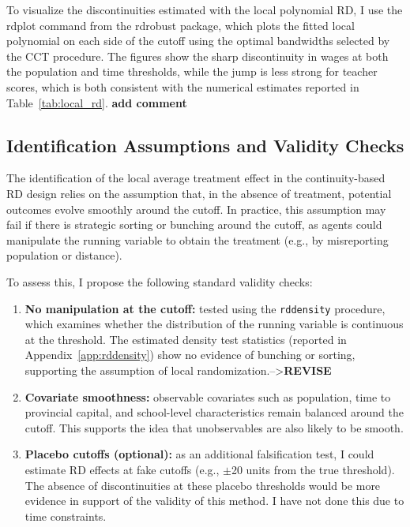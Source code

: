\documentclass{article}
\begin{document}
To visualize the discontinuities estimated with the local polynomial RD, I use the rdplot command from the rdrobust package, which plots the fitted local polynomial on each side of the cutoff using the optimal bandwidths selected by the CCT procedure. The figures show the sharp discontinuity in wages at both the population and time thresholds, while the jump is less strong for teacher scores, which is both consistent with the numerical estimates reported in Table~\ref{tab:local_rd}.
 \textbf{add comment}


\subsection{Identification Assumptions and Validity Checks}

The identification of the local average treatment effect in the continuity-based RD design relies on the assumption that, in the absence of treatment, potential outcomes evolve smoothly around the cutoff. In practice, this assumption may fail if there is strategic sorting or bunching around the cutoff, as agents could manipulate the running variable to obtain the treatment (e.g., by misreporting population or distance). 

To assess this, I propose the following standard validity checks:

\begin{enumerate}
    \item \textbf{No manipulation at the cutoff:} tested using the \texttt{rddensity} procedure, which examines whether the distribution of the running variable is continuous at the threshold. The estimated density test statistics (reported in Appendix~\ref{app:rddensity}) show no evidence of bunching or sorting, supporting the assumption of local randomization.-->\textbf{REVISE}
    
    \item \textbf{Covariate smoothness:} observable covariates such as population, time to provincial capital, and school-level characteristics remain balanced around the cutoff. This supports the idea that unobservables are also likely to be smooth.

    
    \item \textbf{Placebo cutoffs (optional):} as an additional falsification test, I could estimate RD effects at fake cutoffs (e.g., $\pm$20 units from the true threshold). The absence of discontinuities at these placebo thresholds would be more evidence in support of the validity of this method. I have not done this due to time constraints.
\end{enumerate}
\end{document}
